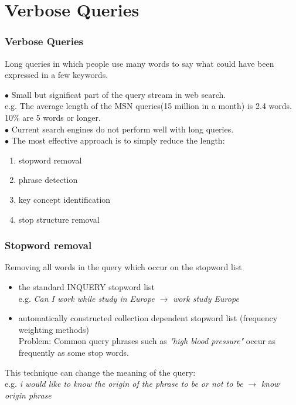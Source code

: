 \section{Verbose Queries}

\begin{frame}
\frametitle{Verbose Queries}
\begin{block}
	{Long queries in which people use many words to say what could have been expressed in a few keywords.}
\end{block}
$\bullet$
	Small but significat part of the query stream in web search.\\
	e.g. The average length of the MSN queries(15 million in a month) is 2.4 words. 10\% are 5 words or longer.\\
\vskip10pt
$\bullet$
	Current search engines do not perform well with long queries.\\
\vskip10pt
$\bullet$
	The most effective approach is to simply reduce the length:
	\begin{enumerate}
	\item
		stopword removal
	\item
		phrase detection
	\item
		key concept identification
	\item
		stop structure removal
	\end{enumerate}
\end{frame}

\begin{frame}
\frametitle{Stopword removal}
\begin{block}
	{Removing all words in the query which occur on the stopword list}
\end{block}
\begin{itemize}
\item
the standard INQUERY stopword list \\
e.g. \textit{Can I work while study in Europe} $\rightarrow$ \textit{work study Europe}	
\item
automatically constructed collection dependent stopword list (frequency weighting methods)\\
Problem: Common query phrases such as \textit{"high blood pressure"} occur as frequently as some stop words.
\end{itemize}
\vskip10pt
This technique can change the meaning of the query:\\
e.g. \textit{i would like to know the origin of the phrase to be or not to be} $\rightarrow$ \textit{know origin phrase}
\end{frame}

